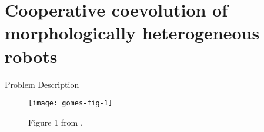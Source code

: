 \section{Cooperative coevolution of morphologically heterogeneous robots \cite{gomes2015cooperative}}

\begin{frame}{Problem Description}

\begin{figure}

\texttt{[image: gomes-fig-1]}

\caption{
Figure 1 from \cite{gomes2015cooperative}.
}

\end{figure}


\end{frame}
